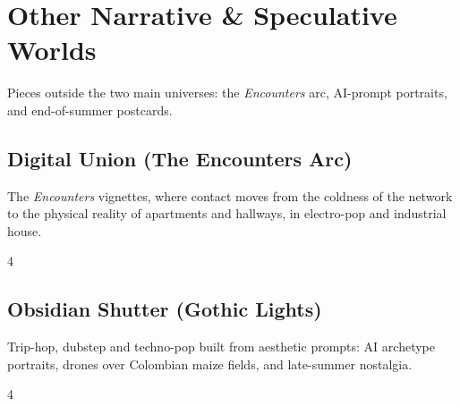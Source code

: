 \documentclass[a4paper,landscape]{memoir}
\begin{document}
\part{Other Narrative \& Speculative Worlds}
Pieces outside the two main universes: the \emph{Encounters} arc, AI-prompt portraits, and end-of-summer postcards.

\chapter{Digital Union (The Encounters Arc)}
The \emph{Encounters} vignettes, where contact moves from the coldness of the network to the physical reality of apartments and hallways, in electro-pop and industrial house.
\clearpage\begin{multicols*}{4}
\end{multicols*}

\chapter{Obsidian Shutter (Gothic Lights)}
Trip-hop, dubstep and techno-pop built from aesthetic prompts: AI archetype portraits, drones over Colombian maize fields, and late-summer nostalgia.
\clearpage\begin{multicols*}{4}
\end{multicols*}
\end{document}
